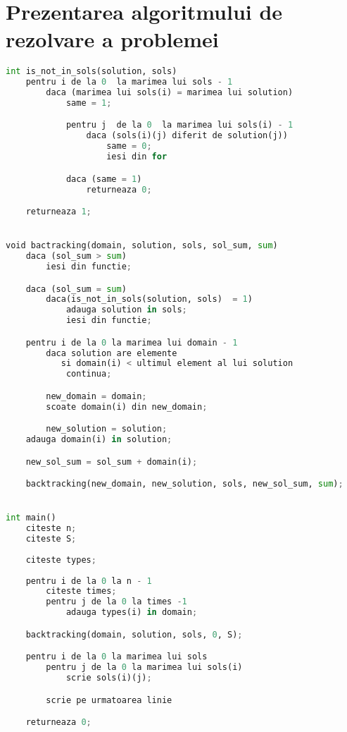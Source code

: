 \section{Prezentarea algoritmului de rezolvare a problemei}
\begin{lstlisting}[language=Python]
int is_not_in_sols(solution, sols)
	pentru i de la 0  la marimea lui sols - 1
		daca (marimea lui sols(i) = marimea lui solution)
			same = 1;

			pentru j  de la 0  la marimea lui sols(i) - 1
				daca (sols(i)(j) diferit de solution(j))
					same = 0;
					iesi din for

			daca (same = 1)
				returneaza 0;

	returneaza 1;


void bactracking(domain, solution, sols, sol_sum, sum)
	daca (sol_sum > sum)
		iesi din functie;

	daca (sol_sum = sum)
		daca(is_not_in_sols(solution, sols)  = 1)
			adauga solution in sols;
			iesi din functie;

	pentru i de la 0 la marimea lui domain - 1
		daca solution are elemente 
		   si domain(i) < ultimul element al lui solution
			continua;

		new_domain = domain;
		scoate domain(i) din new_domain;

		new_solution = solution;
	adauga domain(i) in solution;

	new_sol_sum = sol_sum + domain(i);

	backtracking(new_domain, new_solution, sols, new_sol_sum, sum);


int main()
	citeste n;
	citeste S;
	
	citeste types;
	
	pentru i de la 0 la n - 1
		citeste times;
		pentru j de la 0 la times -1
			adauga types(i) in domain;

	backtracking(domain, solution, sols, 0, S);

	pentru i de la 0 la marimea lui sols
		pentru j de la 0 la marimea lui sols(i)
			scrie sols(i)(j);

		scrie pe urmatoarea linie

	returneaza 0;
\end{lstlisting}

\vspace{10mm}
